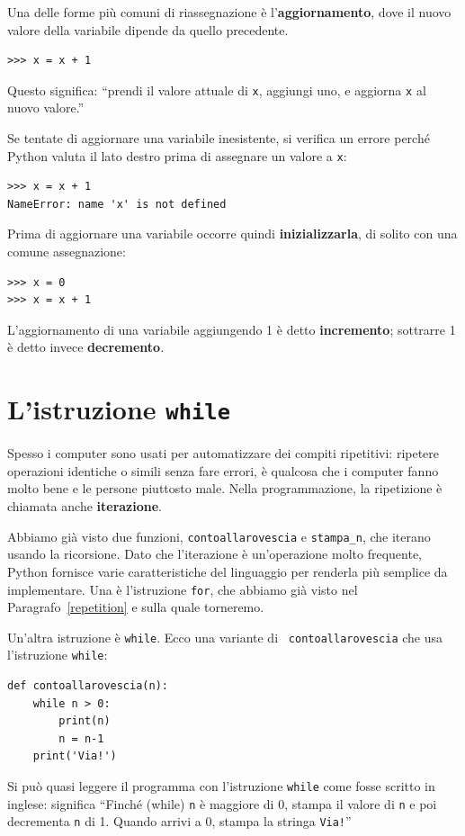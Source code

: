 \documentclass[10pt]{book}
\begin{document}
Una delle forme più comuni di riassegnazione è l'{\bf aggiornamento},
dove il nuovo valore della variabile dipende da quello precedente.

\begin{verbatim}
>>> x = x + 1
\end{verbatim}
%
Questo significa: ``prendi il valore attuale di {\tt x}, aggiungi uno, e aggiorna {\tt x} al nuovo valore.''

Se tentate di aggiornare una variabile inesistente, si verifica un errore perché Python valuta il lato destro prima di assegnare un valore a {\tt x}:

\begin{verbatim}
>>> x = x + 1
NameError: name 'x' is not defined
\end{verbatim}
%
Prima di aggiornare una variabile occorre quindi {\bf inizializzarla},
di solito con una comune assegnazione:

\begin{verbatim}
>>> x = 0
>>> x = x + 1
\end{verbatim}
%
L'aggiornamento di una variabile aggiungendo 1 è detto {\bf incremento};
sottrarre 1 è detto invece {\bf decremento}.


\section{L'istruzione {\tt while}}

Spesso i computer sono usati per automatizzare dei compiti ripetitivi: ripetere operazioni identiche o simili senza fare errori, è qualcosa che i computer fanno molto bene e le persone piuttosto male. Nella programmazione, la ripetizione è chiamata anche {\bf iterazione}.

Abbiamo già visto due funzioni, {\tt contoallarovescia} e \verb"stampa_n", che iterano usando la ricorsione. Dato che l'iterazione è un'operazione molto frequente, Python fornisce varie caratteristiche del linguaggio per renderla più semplice da implementare. Una è l'istruzione {\tt for}, che abbiamo già visto nel Paragrafo~\ref{repetition} e sulla quale torneremo.

Un'altra istruzione è {\tt while}. Ecco una variante di {\tt
contoallarovescia} che usa l'istruzione {\tt while}:

\begin{verbatim}
def contoallarovescia(n):
    while n > 0:
        print(n)
        n = n-1
    print('Via!')
\end{verbatim}
%
Si può quasi leggere il programma con l'istruzione {\tt while} come fosse scritto in inglese: significa ``Finché (while) {\tt n} è maggiore di 0, stampa il valore di {\tt n} e poi decrementa {\tt n} di 1.  Quando arrivi a 0, stampa la stringa {\tt Via!}''
\end{document}
